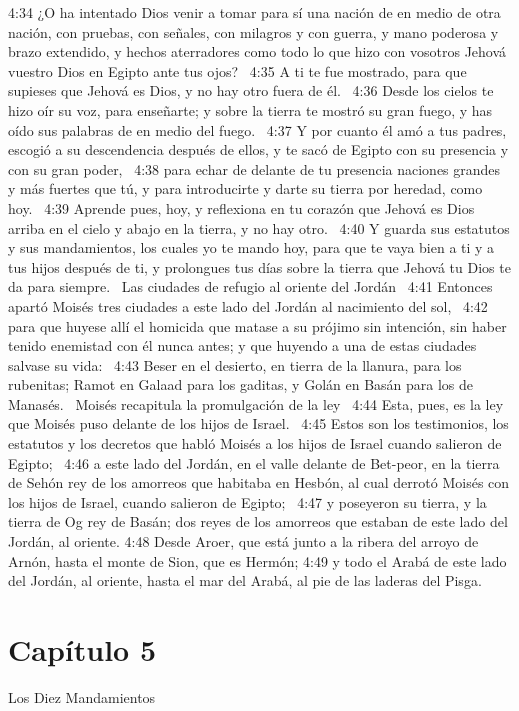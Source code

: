 4:34 ¿O ha intentado Dios venir a tomar para sí una nación de en medio de otra nación, con pruebas, con señales, con milagros y con guerra, y mano poderosa y brazo extendido, y hechos aterradores como todo lo que hizo con vosotros Jehová vuestro Dios en Egipto ante tus ojos?  
4:35 A ti te fue mostrado, para que supieses que Jehová es Dios, y no hay otro fuera de él.  
4:36 Desde los cielos te hizo oír su voz, para enseñarte; y sobre la tierra te mostró su gran fuego, y has oído sus palabras de en medio del fuego.  
4:37 Y por cuanto él amó a tus padres, escogió a su descendencia después de ellos, y te sacó de Egipto con su presencia y con su gran poder,  
4:38 para echar de delante de tu presencia naciones grandes y más fuertes que tú, y para introducirte y darte su tierra por heredad, como hoy.  
4:39 Aprende pues, hoy, y reflexiona en tu corazón que Jehová es Dios arriba en el cielo y abajo en la tierra, y no hay otro.  
4:40 Y guarda sus estatutos y sus mandamientos, los cuales yo te mando hoy, para que te vaya bien a ti y a tus hijos después de ti, y prolongues tus días sobre la tierra que Jehová tu Dios te da para siempre.  
Las ciudades de refugio al oriente del Jordán  
4:41 Entonces apartó Moisés tres ciudades a este lado del Jordán al nacimiento del sol,  
4:42 para que huyese allí el homicida que matase a su prójimo sin intención, sin haber tenido enemistad con él nunca antes; y que huyendo a una de estas ciudades salvase su vida:  
4:43 Beser en el desierto, en tierra de la llanura, para los rubenitas; Ramot en Galaad para los gaditas, y Golán en Basán para los de Manasés.  
Moisés recapitula la promulgación de la ley  
4:44 Esta, pues, es la ley que Moisés puso delante de los hijos de Israel.  
4:45 Estos son los testimonios, los estatutos y los decretos que habló Moisés a los hijos de Israel cuando salieron de Egipto;  
4:46 a este lado del Jordán, en el valle delante de Bet-peor, en la tierra de Sehón rey de los amorreos que habitaba en Hesbón, al cual derrotó Moisés con los hijos de Israel, cuando salieron de Egipto;  
4:47 y poseyeron su tierra, y la tierra de Og rey de Basán; dos reyes de los amorreos que estaban de este lado del Jordán, al oriente. 
4:48 Desde Aroer, que está junto a la ribera del arroyo de Arnón, hasta el monte de Sion, que es Hermón; 
4:49 y todo el Arabá de este lado del Jordán, al oriente, hasta el mar del Arabá, al pie de las laderas del Pisga.  
\section*{Capítulo 5 }
Los Diez Mandamientos   

